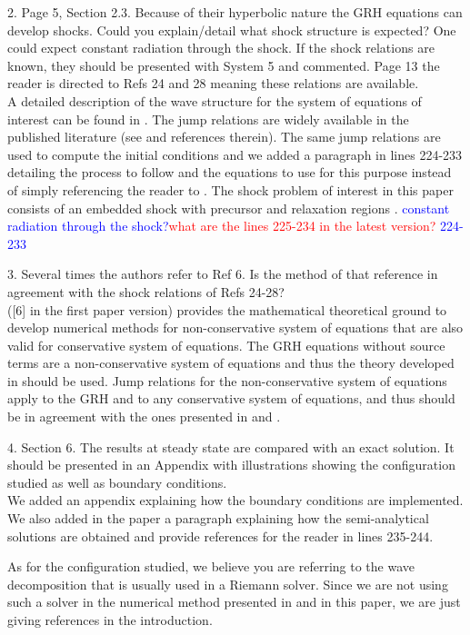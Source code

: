\documentclass{article}
\newcommand{\tcr}[1]{\textcolor{red}{#1}}
\newcommand{\tcb}[1]{\textcolor{blue}{#1}}
\begin{document}
{\color{blue}
2. Page 5, Section 2.3. Because of their hyperbolic nature the GRH equations can develop shocks.
Could you explain/detail what shock structure is expected? One could expect constant radiation through the shock.
If the shock relations are known, they should be presented with System 5 and commented. Page 13 the reader is directed to Refs 24 and 28 meaning these relations are available.\\}
A detailed description of the wave structure for the system of equations of interest can be found in \cite{Balsara}. The jump relations are widely available in the published literature (see \cite{LowrieEdwards, LowrieMorelHittinger} and references therein). The same jump relations are used to compute the initial conditions and we added a paragraph in lines 224-233 detailing the process to follow and the equations to use for this purpose instead of simply referencing the reader to \cite{LowrieEdwards}. The shock problem of interest in this paper consists of an embedded shock with precursor and relaxation regions \cite{LowrieEdwards}.
\tcb{constant radiation through the shock?}\tcr{what are the lines 225-234 in the latest version? } \tcb{224-233}
\bigskip

{\color{blue}
3. Several times the authors refer to Ref 6. Is the method of that reference in agreement with the shock relations of Refs 24-28?
\\}
\cite{dlm} ([6] in the first paper version) provides the mathematical theoretical ground to develop numerical methods for non-conservative system of equations that are also valid for conservative system of equations. The GRH equations without source terms are a non-conservative system of equations and thus the theory developed in \cite{dlm} should be used. Jump relations for the non-conservative system of equations apply to the GRH and to any conservative system of equations, and thus should be in agreement with the ones presented in \cite{LowrieEdwards} and \cite{Toro}.
\bigskip

{\color{blue}
4. Section 6. The results at steady state are compared with an exact solution. It should be presented in an Appendix with illustrations showing the configuration studied as well as boundary conditions. \\}
We added an appendix explaining how the boundary conditions are implemented. We also added in the paper a paragraph explaining how the semi-analytical solutions are obtained and provide references for the reader in lines 235-244.

As for the configuration studied, we believe you are referring to the wave decomposition that is usually used in a Riemann solver. Since we are not using such a solver in the numerical method presented in \cite{our_jcp_radhy_paper} and in this paper, we are just giving references in the introduction.
\bigskip
\end{document}
